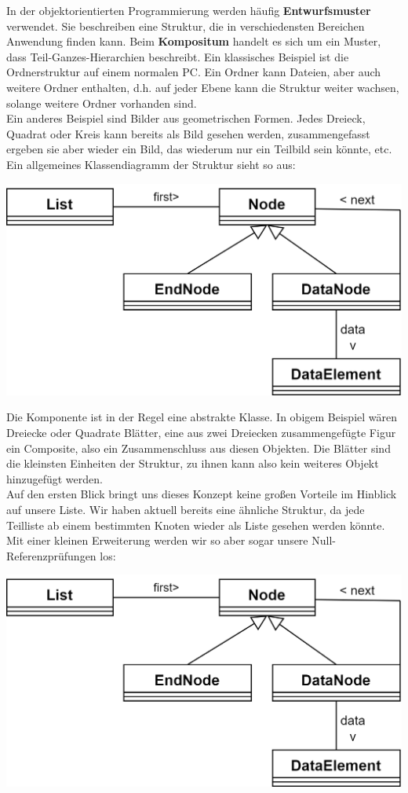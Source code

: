 \documentclass{article}
\begin{document}
In der objektorientierten Programmierung werden häufig \textbf{Entwurfsmuster} verwendet. Sie beschreiben eine Struktur, die in verschiedensten Bereichen Anwendung finden kann. Beim \textbf{Kompositum} handelt es sich um ein Muster, dass Teil-Ganzes-Hierarchien beschreibt. Ein klassisches Beispiel ist die Ordnerstruktur auf einem normalen PC. Ein Ordner kann Dateien, aber auch weitere Ordner enthalten, d.h. auf jeder Ebene kann die Struktur weiter  wachsen, solange weitere Ordner vorhanden sind. \\
Ein anderes Beispiel sind Bilder aus geometrischen Formen. Jedes Dreieck, Quadrat oder Kreis kann bereits als Bild gesehen werden, zusammengefasst ergeben sie aber wieder ein Bild, das wiederum nur ein Teilbild sein könnte, etc. \\
Ein allgemeines Klassendiagramm der Struktur sieht so aus: 
\begin{center}
    \includegraphics[scale=0.2]{../media/compositum_lists.png}
\end{center}
Die Komponente ist in der Regel eine abstrakte Klasse. In obigem Beispiel wären Dreiecke oder Quadrate Blätter, eine aus zwei Dreiecken zusammengefügte Figur ein Composite, also ein Zusammenschluss aus diesen Objekten. Die Blätter sind die kleinsten Einheiten der Struktur, zu ihnen kann also kein weiteres Objekt hinzugefügt werden. \\
Auf den ersten Blick bringt uns dieses Konzept keine großen Vorteile im Hinblick auf unsere Liste. Wir haben aktuell bereits eine ähnliche Struktur, da jede Teilliste ab einem bestimmten Knoten wieder als Liste gesehen werden könnte. Mit einer kleinen Erweiterung werden wir so aber sogar unsere Null-Referenzprüfungen los: 
\begin{center}
    \includegraphics[scale=0.2]{../media/compositum_lists.png}
\end{center}
\end{document}
